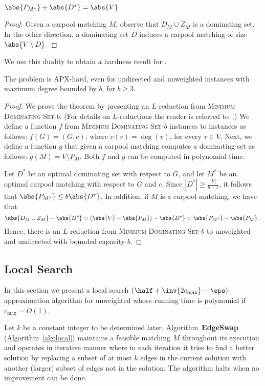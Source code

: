 \begin{observation}
$\abs{P_{M^*}} + \abs{D^*} = \abs{V}$ 
\end{observation}
\begin{proof}
Given a carpool matching $M$, observe that $D_M \cup Z_M$ is a
dominating set.  In the other direction, a dominating set $D$ induces
a carpool matching of size $\abs{V \setminus D}$.
\end{proof}

We use this duality to obtain a hardness result for \carpool.

\begin{theorem}
The \carpool problem is APX-hard, even for undirected and unweighted
instances with maximum degree bounded by $b$, for $b \geq 3$.
\end{theorem}
\begin{proof}
We prove the theorem by presenting an $L$-reduction from
\textsc{Minimum Dominating Set-$b$}.
(For details on $L$-reductions the reader is referred to~\cite{PapYan88}.)
%
We define a function $f$ from \textsc{Minimum Dominating Set-$b$}
instances to \carpool instances as follows: $f(G) = (G,c)$, where
$c(v) = \deg(v)$, for every $v \in V$.  Next, we define a function $g$
that given a carpool matching computes a dominating set as follows:
$g(M) = V \setminus P_{M}$.  Both $f$ and $g$ can be computed in
polynomial time.

Let $D^*$ be an optimal dominating set with respect to $G$, and let
$M^*$ be an optimal carpool matching with respect to $G$ and $c$.
Since $|D^*| \geq \frac{|V|}{b+1}$, it follows that 
\(
\abs{P_{M^*}} \leq b \abs{D^*}
\),
In addition, if $M$ is a carpool matching, we have that
\[
\abs{D_M \cup Z_M} - \abs{D^*}
= (\abs{V} - \abs{P_M}) - \abs{D^*}
= \abs{P_{M^*}} - \abs{P_M}
~.
\]
Hence, there is an $L$-reduction from \textsc{Minimum Dominating
Set-$b$} to unweighted and undirected \carpool with bounded capacity
$b$.
\end{proof}


\subsection{Local Search}
\label{sec:local}

In this section we present a local search $(\half + \inv{2c_{\max}} -
\eps)$-approximation algorithm for unweighted \carpool whose running
time is polynomial if $c_{\max} = O(1)$.

Let $k$ be a constant integer to be determined later.
Algorithm~\textbf{EdgeSwap} (Algorithm~\ref{alg:local}) maintains a
feasible matching $M$ throughout its execution and operates in
iterative manner where in each iteration it tries to find a better
solution by replacing a subset of at most $k$ edges in the current
solution with another (larger) subset of edges not in the solution.
The algorithm halts when no improvement can be done. 


